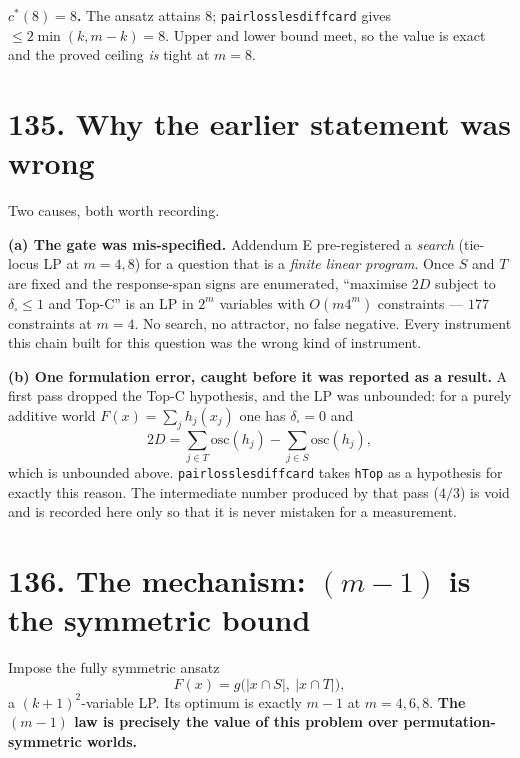 \documentclass[9pt,twocolumn]{article}
\renewcommand{\_}{\CIGunderscore\allowbreak}
\begin{document}
\textbf{$c^\ast(8)=8$.} The ansatz attains $8$; \texttt{pair\_loss\_le\_sdiff\_card} gives $\le 2\min(k,m-k)=8$. Upper and lower bound meet, so the value is exact and the proved ceiling \emph{is} tight at $m=8$.

\section*{135. Why the earlier statement was wrong}
Two causes, both worth recording.

\textbf{(a) The gate was mis-specified.} Addendum E pre-registered a \emph{search} (tie-locus LP at $m=4,8$) for a question that is a \emph{finite linear program}. Once $S$ and $T$ are fixed and the response-span signs are enumerated, ``maximise $2D$ subject to $\delta_\square\le1$ and Top-C'' is an LP in $2^m$ variables with $O(m4^m)$ constraints --- $177$ constraints at $m=4$. No search, no attractor, no false negative. Every instrument this chain built for this question was the wrong kind of instrument.

\textbf{(b) One formulation error, caught before it was reported as a result.} A first pass dropped the Top-C hypothesis, and the LP was unbounded: for a purely additive world $F(x)=\sum_j h_j(x_j)$ one has $\delta_\square=0$ and
\[2D=\sum_{j\in T}\mathrm{osc}(h_j)-\sum_{j\in S}\mathrm{osc}(h_j),\]
which is unbounded above. \texttt{pair\_loss\_le\_sdiff\_card} takes \texttt{hTop} as a hypothesis for exactly this reason. The intermediate number produced by that pass ($4/3$) is void and is recorded here only so that it is never mistaken for a measurement.

\section*{136. The mechanism: $(m-1)$ is the symmetric bound}
Impose the fully symmetric ansatz
\[F(x)=g\bigl(|x\cap S|,\ |x\cap T|\bigr),\]
a $(k+1)^2$-variable LP. Its optimum is exactly $m-1$ at $m=4,6,8$. \textbf{The $(m-1)$ law is precisely the value of this problem over permutation-symmetric worlds.}
\end{document}
